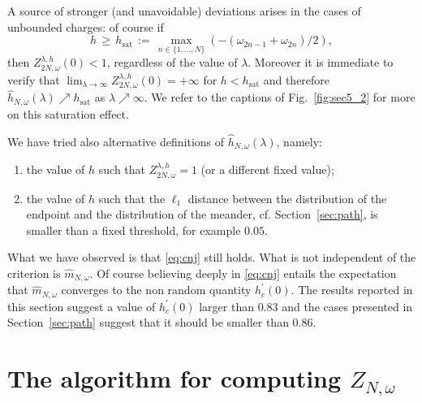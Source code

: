 \documentclass[reqno,11pt]{amsart}
\numberwithin{equation}{section}
\newcommand{\go}{\omega}
\newcommand{\gl}{\lambda}
\begin{document}
A source of stronger (and unavoidable) deviations arises in the cases of unbounded charges:
of course if
\begin{equation}
\label{eq:sat}
h\, \ge \,  h_{\text{sat}} \, :=\, \max_{n\in \{1, \ldots, N \}} \left( -(\go_{2n-1}+ \go_{2n})/2 \right),
\end{equation}
then
$Z^{\gl, h}_{2N, \go} (0) <1$, regardless of the value of $\gl$.
Moreover it is immediate to verify that $\lim_{\gl \to \infty } Z^{\gl, h}_{2N, \go}(0) =+\infty$
for $h<  h_{\text{sat}}$ and therefore $\hat h _{N, \go} (\gl)\nearrow h_{\text{sat}} $
as $\gl \nearrow \infty$. We refer to the captions of Fig.~\ref{fig:sec5_2} for
more on this saturation effect.
 \smallskip




We have tried also alternative definitions of $\hat h _{N, \go} (\gl)$, namely:
\begin{enumerate}
\item the value of $h$ such that $ Z_{2N, \go}^{\gl, h} =1$ (or a different fixed value);
\item the value of $h$ such that the $\ell_1$ distance between
the distribution of the endpoint and the distribution of the meander, cf. Section~\ref{sec:path}, is smaller than a fixed threshold, for example $0.05$.
\end{enumerate}

What we have observed is that \eqref{eq:cnj} still holds.
What is not independent of the criterion is
 $\hat m_{N, \go}$.
 Of course believing deeply in \eqref{eq:cnj} entails
 the expectation  that $\hat m_{N, \go}$ converges to the non random
 quantity $h ^\prime_c (0)$.
  The results reported in this section suggest a value of $h ^\prime_c (0) $ larger than $0.83$
 and the cases presented in Section~\ref{sec:path} suggest that it should be smaller than $0.86$.






\appendix

\section{The algorithm for computing $Z_{N,\go}$}
\label{app:algo}
\end{document}
